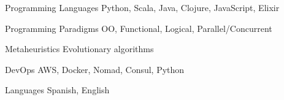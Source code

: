 


\begin{cvskills}




\cvskill
{Programming Languages} %
{Python, Scala, Java, Clojure, JavaScript, Elixir} %


\cvskill
{Programming Paradigms} %
{OO, Functional, Logical, Parallel/Concurrent} %


\cvskill
{Metaheuristics} %
{Evolutionary algorithms} %


\cvskill
{DevOps} %
{AWS, Docker, Nomad, Consul, Python} %


\cvskill
{Languages} %
{Spanish, English} %




\end{cvskills}
